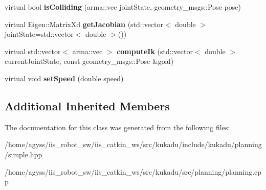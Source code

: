 \begin{DoxyCompactItemize}
\item 
virtual bool {\bfseries is\+Colliding} (arma\+::vec joint\+State, geometry\+\_\+msgs\+::\+Pose pose)\hypertarget{classkukadu_1_1SimplePlanner_a6848bec97693943933a9f55c72215e75}{}\label{classkukadu_1_1SimplePlanner_a6848bec97693943933a9f55c72215e75}

\item 
virtual Eigen\+::\+Matrix\+Xd {\bfseries get\+Jacobian} (std\+::vector$<$ double $>$ joint\+State=std\+::vector$<$ double $>$())\hypertarget{classkukadu_1_1SimplePlanner_a00b1f03b60b407dda558d9d5a026c23a}{}\label{classkukadu_1_1SimplePlanner_a00b1f03b60b407dda558d9d5a026c23a}

\item 
virtual std\+::vector$<$ arma\+::vec $>$ {\bfseries compute\+Ik} (std\+::vector$<$ double $>$ current\+Joint\+State, const geometry\+\_\+msgs\+::\+Pose \&goal)\hypertarget{classkukadu_1_1SimplePlanner_aa90b54858bfda912bcc906224b065ed2}{}\label{classkukadu_1_1SimplePlanner_aa90b54858bfda912bcc906224b065ed2}

\item 
virtual void {\bfseries set\+Speed} (double speed)\hypertarget{classkukadu_1_1SimplePlanner_a0f37848fb642544c627c14c7d36d5487}{}\label{classkukadu_1_1SimplePlanner_a0f37848fb642544c627c14c7d36d5487}

\end{DoxyCompactItemize}
\subsection*{Additional Inherited Members}


The documentation for this class was generated from the following files\+:\begin{DoxyCompactItemize}
\item 
/home/agyss/iis\+\_\+robot\+\_\+sw/iis\+\_\+catkin\+\_\+ws/src/kukadu/include/kukadu/planning/simple.\+hpp\item 
/home/agyss/iis\+\_\+robot\+\_\+sw/iis\+\_\+catkin\+\_\+ws/src/kukadu/src/planning/planning.\+cpp\end{DoxyCompactItemize}
